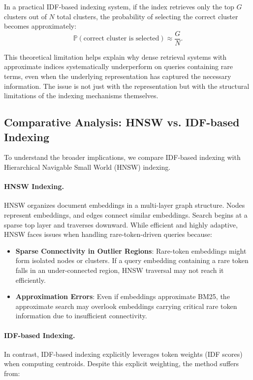 \documentclass[manuscript]{acmart}
\begin{document}
In a practical IDF-based indexing system, if the index retrieves only the top $G$ clusters out of $N$ total clusters, the probability of selecting the correct cluster becomes approximately:
\begin{equation}
\mathbb{P}(\text{correct cluster is selected}) \approx \frac{G}{N}.
\end{equation}

This theoretical limitation helps explain why dense retrieval systems with approximate indices systematically underperform on queries containing rare terms, even when the underlying representation has captured the necessary information. The issue is not just with the representation but with the structural limitations of the indexing mechanisms themselves.

\subsection{Comparative Analysis: HNSW vs. IDF-based Indexing}

To understand the broader implications, we compare IDF-based indexing with Hierarchical Navigable Small World (HNSW) indexing.

\paragraph{HNSW Indexing.}
HNSW organizes document embeddings in a multi-layer graph structure. Nodes represent embeddings, and edges connect similar embeddings. Search begins at a sparse top layer and traverses downward. While efficient and highly adaptive, HNSW faces issues when handling rare-token-driven queries because:

\begin{itemize}
  \item \textbf{Sparse Connectivity in Outlier Regions}: Rare-token embeddings might form isolated nodes or clusters. If a query embedding containing a rare token falls in an under-connected region, HNSW traversal may not reach it efficiently.
  \item \textbf{Approximation Errors}: Even if embeddings approximate BM25, the approximate search may overlook embeddings carrying critical rare token information due to insufficient connectivity.
\end{itemize}

\paragraph{IDF-based Indexing.}
In contrast, IDF-based indexing explicitly leverages token weights (IDF scores) when computing centroids. Despite this explicit weighting, the method suffers from:
\end{document}
